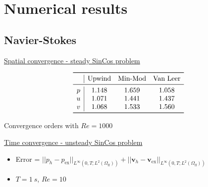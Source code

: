 \documentclass{beamer}
\begin{document}
\section{Numerical results}
\subsection*{Navier-Stokes}
\begin{frame}[label=spaceconv]{\hyperlink{spaceconvSupp}{Spatial convergence - 
steady SinCos problem}}
\vspace{-0.8cm}
\begin{figure}
	\centering
	\subfloat[\tiny Figure: Upwind, 
	$Re=1000$]{\hspace{-0.5cm}}
	\subfloat[\tiny Figure: Min-Mod, 
	$Re=1000$]{}
\end{figure}
\vspace{-0.3cm}
\begin{table}\footnotesize
	\[
	\begin{array}{c|ccc}
	\toprule
	& \text{Upwind} & \text{Min-Mod} & \text{Van Leer} \\ 
	\midrule
	p & 1.148 & 1.659 & 1.058\\
	u & 1.071 & 1.441 & 1.437\\
	v & 1.068 & 1.533 & 1.560\\
	\bottomrule
	\end{array}
	\]
	\caption{\tiny Convergence orders with $Re = 1000$}
\end{table}
\end{frame}
\begin{frame}[label=timeconv]{\hyperlink{timeconvSupp}{Time convergence - 
unsteady SinCos problem}}
\begin{figure}
	\centering
	
\end{figure}
\vspace{-0.3cm}
\begin{itemize}
\item Error = $|\!|p_h - p_\text{ex}|\!|_{L^\infty(0,T;L^2(\Omega_\text{ff}))} 
+ |\!|\mathbf{v}_h - 
\mathbf{v}_\text{ex}|\!|_{L^\infty(0,T;L^2(\Omega_\text{ff}))}$
\item $T = \SI{1}{s}$, $Re=10$
\end{itemize}
\end{frame}
\end{document}
